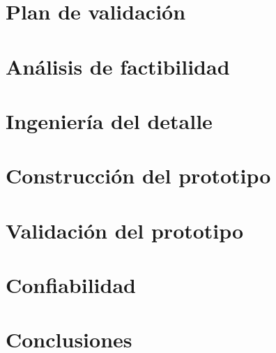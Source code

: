 \section{Plan de validación}
\label{sec:plan_val}
\localtoc

\clearpage

\section{Análisis de factibilidad}
\label{sec:analisis_fact}
\localtoc

\clearpage

\section{Ingeniería del detalle}
\label{sec:ing_detalle}
\localtoc

\clearpage

\section{Construcción del prototipo}
\label{sec:cons_prototipo}
\localtoc

\clearpage

\section{Validación del prototipo}
\label{sec:val_prototipo}
\localtoc

\clearpage

\section{Confiabilidad}
\label{sec:confiabilidad}
\localtoc

\clearpage

\section{Conclusiones}
\label{sec:conclusiones}

\clearpage




\clearpage



\renewcommand{\appendixname}{Anexo}
\renewcommand{\appendixpagename}{Anexos}
\renewcommand{\appendixtocname}{Anexos}

